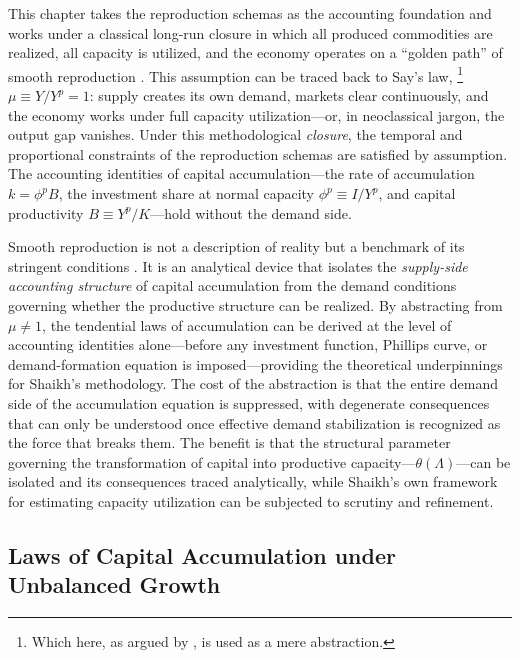 This chapter takes the reproduction schemas as the accounting foundation and works under a classical long-run closure in which all produced commodities are realized, all capacity is utilized, and the economy operates on a ``golden path'' of smooth reproduction \citep{Basu2022}. This assumption can be traced back to Say's law,%
\footnote{Which here, as argued by \citet{Foley1985}, is used as a mere abstraction.}
$\mu \equiv Y/Y^p = 1$: supply creates its own demand, markets clear continuously, and the economy works under full capacity utilization---or, in neoclassical jargon, the output gap vanishes. Under this methodological \emph{closure}, the temporal and proportional constraints of the reproduction schemas are satisfied by assumption. The accounting identities of capital accumulation---the rate of accumulation $k = \phi^p B$, the investment share at normal capacity $\phi^p \equiv I/Y^p$, and capital productivity $B \equiv Y^p/K$---hold without the demand side.

Smooth reproduction is not a description of reality but a benchmark of its stringent conditions \citep{Okishio2022}. It is an analytical device that isolates the \textit{supply-side accounting structure} of capital accumulation from the demand conditions governing whether the productive structure can be realized. By abstracting from $\mu \neq 1$, the tendential laws of accumulation can be derived at the level of accounting identities alone---before any investment function, Phillips curve, or demand-formation equation is imposed---providing the theoretical underpinnings for Shaikh's methodology. The cost of the abstraction is that the entire demand side of the accumulation equation is suppressed, with degenerate consequences that can only be understood once effective demand stabilization is recognized as the force that breaks them. The benefit is that the structural parameter governing the transformation of capital into productive capacity---$\theta(\Lambda)$---can be isolated and its consequences traced analytically, while Shaikh's own framework for estimating capacity utilization can be subjected to scrutiny and refinement.



\subsection{Laws of Capital Accumulation under Unbalanced Growth}
\label{sec:accounting_laws}

